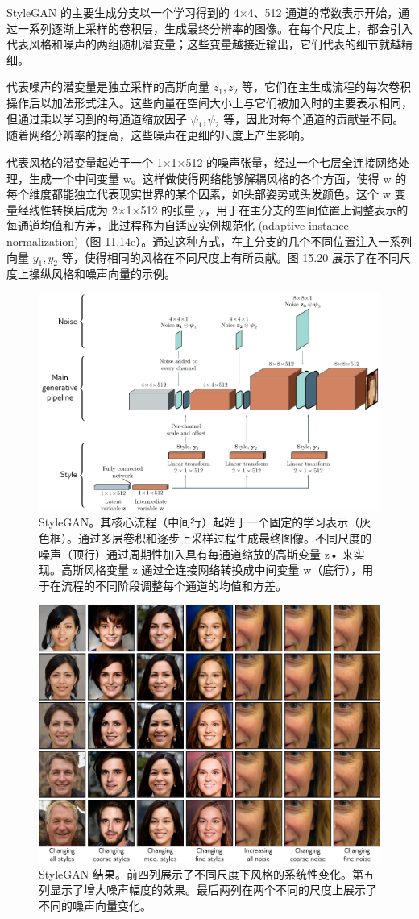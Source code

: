StyleGAN 的主要生成分支以一个学习得到的 4×4、512 通道的常数表示开始，通过一系列逐渐上采样的卷积层，生成最终分辨率的图像。在每个尺度上，都会引入代表风格和噪声的两组随机潜变量；这些变量越接近输出，它们代表的细节就越精细。

代表噪声的潜变量是独立采样的高斯向量 \(z_1, z_2\) 等，它们在主生成流程的每次卷积操作后以加法形式注入。这些向量在空间大小上与它们被加入时的主要表示相同，但通过乘以学习到的每通道缩放因子 \(\psi_1, \psi_2\) 等，因此对每个通道的贡献量不同。随着网络分辨率的提高，这些噪声在更细的尺度上产生影响。

代表风格的潜变量起始于一个 1×1×512 的噪声张量，经过一个七层全连接网络处理，生成一个中间变量 w。这样做使得网络能够解耦风格的各个方面，使得 w 的每个维度都能独立代表现实世界的某个因素，如头部姿势或头发颜色。这个 w 变量经线性转换后成为 2×1×512 的张量 y，用于在主分支的空间位置上调整表示的每通道均值和方差，此过程称为自适应实例规范化 (adaptive instance normalization)（图 11.14e）。通过这种方式，在主分支的几个不同位置注入一系列向量 \(y_1, y_2\) 等，使得相同的风格在不同尺度上有所贡献。图 15.20 展示了在不同尺度上操纵风格和噪声向量的示例。

\begin{figure}[ht!]
\centering
\includegraphics[width=0.7\linewidth]{png/chapter15/GanStyleGANArch.png}
\caption{StyleGAN。其核心流程（中间行）起始于一个固定的学习表示（灰色框）。通过多层卷积和逐步上采样过程生成最终图像。不同尺度的噪声（顶行）通过周期性加入具有每通道缩放的高斯变量 z• 来实现。高斯风格变量 z 通过全连接网络转换成中间变量 w（底行），用于在流程的不同阶段调整每个通道的均值和方差。}
\end{figure}


\begin{figure}[ht!]
\centering
\includegraphics[width=0.7\linewidth]{png/chapter15/GANStyleGANResults.png}
\caption{StyleGAN 结果。前四列展示了不同尺度下风格的系统性变化。第五列显示了增大噪声幅度的效果。最后两列在两个不同的尺度上展示了不同的噪声向量变化。}
\end{figure}


